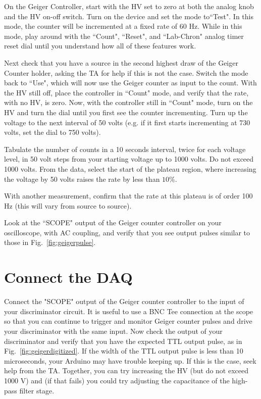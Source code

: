 \documentclass[12pt]{article}
\begin{document}
On the Geiger Controller, start with the HV set to zero at both the analog knob and the HV on-off switch.   Turn on the device and set the mode to``Test".  In this mode, the counter will be incremented at a fixed rate of 60 Hz.   While in this mode, play around with the ``Count", ``Reset", and ``Lab-Chron" analog timer reset dial until you understand how all of these features work.

Next check that you have a source in the second highest draw of the Geiger Counter holder, asking the TA for help if this is not the case.  Switch the mode back to ``Use", which will now use the Geiger counter as input to the count.  With the HV still off, place the controller in ``Count" mode, and verify that the rate, with no HV, is zero.  Now, with the controller still in ``Count" mode, turn on the HV and turn the dial until you first see the counter incrementing.  Turn up the voltage to the next interval of 50 volts (e.g. if it first starts incrementing at 730 volts, set the dial to 750 volts).

Tabulate the number of counts in a 10 seconds interval, twice for each voltage level, in 50 volt steps from your starting voltage up to 1000 volts.  Do not exceed 1000 volts.  From the data, select the start of the plateau region, where increasing the voltage by 50 volts raises the rate by less than $10\%$.

With another measurement, confirm that the rate at this plateau is of order 100 Hz (this will vary from source to source).

Look at the ``SCOPE" output of the Geiger counter controller on your oscilloscope, with AC coupling, and verify that you see output pulses similar to those in Fig.~\ref{fig:geigerpulse}.

\section{Connect the DAQ}

Connect the "SCOPE" output of the Geiger counter controller to the input of your discriminator circuit.  It is useful to use a BNC Tee connection at the scope so that you can continue to trigger and monitor Geiger counter pulses and drive your discriminator with the same input.  Now check the output of your discriminator and verify that you have the expected TTL output pulse, as in Fig.~\ref{fig:geigerdigitized}.  If the width of the TTL output pulse is less than 10 microseconds, your Arduino may have trouble keeping up.   If this is the case, seek help from the TA.  Together, you can try increasing the HV (but do not exceed 1000 V) and (if that fails) you could try adjusting the capacitance of the high-pass filter stage.
\end{document}
